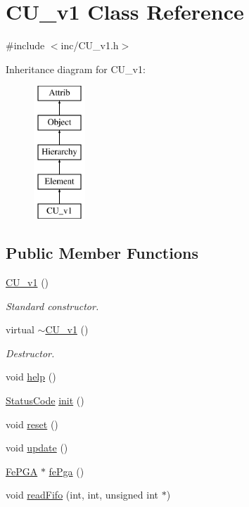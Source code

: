 \hypertarget{classCU__v1}{}\section{C\+U\+\_\+v1 Class Reference}
\label{classCU__v1}


{\ttfamily \#include $<$inc/\+C\+U\+\_\+v1.\+h$>$}

Inheritance diagram for C\+U\+\_\+v1\+:\begin{figure}[H]
\begin{center}
\leavevmode
\includegraphics[height=5.000000cm]{classCU__v1}
\end{center}
\end{figure}
\subsection*{Public Member Functions}
\begin{DoxyCompactItemize}
\item 
\hyperlink{classCU__v1_afe2499a41abcb7cd94830d1eebb9e033}{C\+U\+\_\+v1} ()
\begin{DoxyCompactList}\small\item\em Standard constructor. \end{DoxyCompactList}\item 
virtual \hyperlink{classCU__v1_a5755cbfa835ce6935169e3133a5bfedf}{$\sim$\+C\+U\+\_\+v1} ()
\begin{DoxyCompactList}\small\item\em Destructor. \end{DoxyCompactList}\item 
void \hyperlink{classCU__v1_af4033fc5da7bff845565d7e6ea1802ce}{help} ()
\item 
\hyperlink{classStatusCode}{Status\+Code} \hyperlink{classCU__v1_a67278e2e8dcbd9b1e3a0284605f4103c}{init} ()
\item 
void \hyperlink{classCU__v1_add509ddd31f1a0c4d68b889ba6edfdb3}{reset} ()
\item 
void \hyperlink{classCU__v1_ac207d770edae7014f9b8ef86c43afc2c}{update} ()
\item 
\hyperlink{classFePGA}{Fe\+P\+GA} $\ast$ \hyperlink{classCU__v1_a6bdee7e086b6c0b2acee0879aee137ed}{fe\+Pga} ()
\item 
void \hyperlink{classCU__v1_ab57452edfcad0fa9efb23f8e4c532602}{read\+Fifo} (int, int, unsigned int $\ast$)
\end{DoxyCompactItemize}
